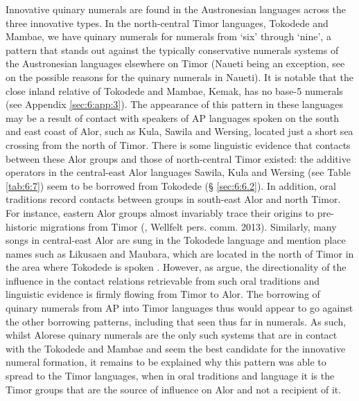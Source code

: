     Innovative quinary numerals are found in the Austronesian languages across the three innovative types. In the north-central Timor languages, Tokodede and Mambae, we have quinary numerals for numerals from `six' through `nine', a pattern that stands out against the typically conservative numerals systems of the Austronesian languages elsewhere on Timor (Naueti being an exception, see \citet{SchapperEtAl2013} on the possible reasons for the quinary numerals in Naueti). It is notable that the close inland relative of Tokodede and Mambae, Kemak, has no base-5 numerals (see Appendix \ref{sec:6:app:3}). The appearance of this pattern in these languages may be a result of contact with speakers of AP languages spoken on the south and east coast of Alor, such as Kula, Sawila and Wersing, located just a short sea crossing from the north of Timor. There is some linguistic evidence that contacts between these Alor groups and those of north-central Timor existed: the additive operators in the central-east Alor languages Sawila, Kula and Wersing (see Table \ref{tab:6:7}) seem to be borrowed from Tokodede ({\S} \ref{sec:6:6.2}). In addition, oral traditions record contacts between groups in south-east Alor and north Timor. For instance, eastern Alor groups almost invariably trace their origins to pre-historic migrations from Timor (\citealt{WellfeltEtAl2013}, Wellfelt pers. comm. 2013). Similarly, many songs in central-east Alor are sung in the Tokodede language and mention place names such as Likusaen and Maubara, which are located in the north of Timor in the area where Tokodede is spoken \citep{WellfeltEtAl2013}. However, as \citet{WellfeltEtAl2013} argue, the directionality of the influence in the contact relations retrievable from such oral traditions and linguistic evidence is firmly flowing from Timor to Alor. The borrowing of quinary numerals from AP into Timor languages thus would appear to go against the other borrowing patterns, including that seen thus far in numerals. As such, whilst Alorese quinary numerals are the only such systems that are in contact with the Tokodede and Mambae and seem the best candidate for the innovative numeral formation, it remains to be explained why this pattern was able to spread to the Timor languages, when in oral traditions and language it is the Timor groups that are the source of influence on Alor and not a recipient of it.

